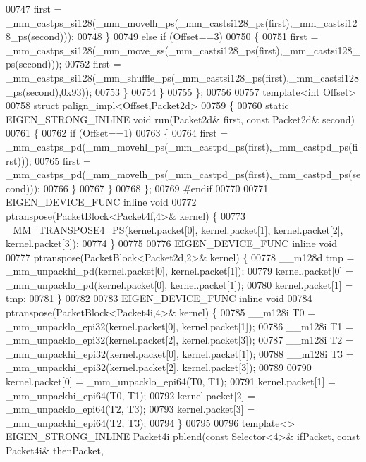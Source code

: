 \begin{DoxyCode}
{{00747       first = \_mm\_castps\_si128(\_mm\_movelh\_ps(\_mm\_castsi128\_ps(first),\_mm\_castsi128\_ps(second)));
00748     \}
00749     \textcolor{keywordflow}{else} \textcolor{keywordflow}{if} (Offset==3)
00750     \{
00751       first = \_mm\_castps\_si128(\_mm\_move\_ss(\_mm\_castsi128\_ps(first),\_mm\_castsi128\_ps(second)));
00752       first = \_mm\_castps\_si128(\_mm\_shuffle\_ps(\_mm\_castsi128\_ps(first),\_mm\_castsi128\_ps(second),0x93));
00753     \}
00754   \}
00755 \};
00756 
00757 \textcolor{keyword}{template}<\textcolor{keywordtype}{int} Offset>
00758 \textcolor{keyword}{struct }palign\_impl<Offset,Packet2d>
00759 \{
00760   \textcolor{keyword}{static} EIGEN\_STRONG\_INLINE \textcolor{keywordtype}{void} run(Packet2d& first, \textcolor{keyword}{const} Packet2d& second)
00761   \{
00762     \textcolor{keywordflow}{if} (Offset==1)
00763     \{
00764       first = \_mm\_castps\_pd(\_mm\_movehl\_ps(\_mm\_castpd\_ps(first),\_mm\_castpd\_ps(first)));
00765       first = \_mm\_castps\_pd(\_mm\_movelh\_ps(\_mm\_castpd\_ps(first),\_mm\_castpd\_ps(second)));
00766     \}
00767   \}
00768 \};
00769 \textcolor{preprocessor}{#endif}
00770 
00771 EIGEN\_DEVICE\_FUNC \textcolor{keyword}{inline} \textcolor{keywordtype}{void}
00772 ptranspose(PacketBlock<Packet4f,4>& kernel) \{
00773   \_MM\_TRANSPOSE4\_PS(kernel.packet[0], kernel.packet[1], kernel.packet[2], kernel.packet[3]);
00774 \}
00775 
00776 EIGEN\_DEVICE\_FUNC \textcolor{keyword}{inline} \textcolor{keywordtype}{void}
00777 ptranspose(PacketBlock<Packet2d,2>& kernel) \{
00778   \_\_m128d tmp = \_mm\_unpackhi\_pd(kernel.packet[0], kernel.packet[1]);
00779   kernel.packet[0] = \_mm\_unpacklo\_pd(kernel.packet[0], kernel.packet[1]);
00780   kernel.packet[1] = tmp;
00781 \}
00782 
00783 EIGEN\_DEVICE\_FUNC \textcolor{keyword}{inline} \textcolor{keywordtype}{void}
00784 ptranspose(PacketBlock<Packet4i,4>& kernel) \{
00785   \_\_m128i T0 = \_mm\_unpacklo\_epi32(kernel.packet[0], kernel.packet[1]);
00786   \_\_m128i T1 = \_mm\_unpacklo\_epi32(kernel.packet[2], kernel.packet[3]);
00787   \_\_m128i T2 = \_mm\_unpackhi\_epi32(kernel.packet[0], kernel.packet[1]);
00788   \_\_m128i T3 = \_mm\_unpackhi\_epi32(kernel.packet[2], kernel.packet[3]);
00789 
00790   kernel.packet[0] = \_mm\_unpacklo\_epi64(T0, T1);
00791   kernel.packet[1] = \_mm\_unpackhi\_epi64(T0, T1);
00792   kernel.packet[2] = \_mm\_unpacklo\_epi64(T2, T3);
00793   kernel.packet[3] = \_mm\_unpackhi\_epi64(T2, T3);
00794 \}
00795 
00796 \textcolor{keyword}{template}<> EIGEN\_STRONG\_INLINE Packet4i pblend(\textcolor{keyword}{const} Selector<4>& ifPacket, \textcolor{keyword}{const} Packet4i& thenPacket, \textcolor{keyword}{
}}}
\end{DoxyCode}
